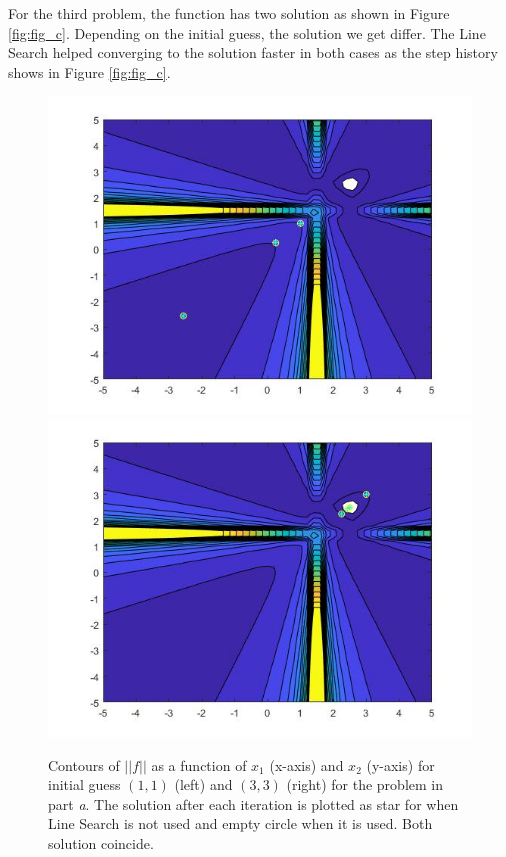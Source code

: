 For the third problem, the function has two solution as shown in Figure \ref{fig:fig_c}. Depending on the initial guess, the solution we get differ. The Line Search helped converging to the solution faster in both cases as the step history shows in Figure \ref{fig:fig_c}. 


\begin{figure}[H]
 \centering  
   {\includegraphics[width=0.49\linewidth]{code/fun1_a1.jpg}}   
   {\includegraphics[width=0.49\linewidth]{code/fun1_a2.jpg}}
  \caption{Contours of $||f||$ as a function of $x_{1}$ (x-axis) and $x_{2}$ (y-axis) for initial guess $(1,1)$ (left) and $(3,3)$ (right) for the problem in part \emph{a}. The solution after each iteration is plotted as star for when Line Search is not used and empty circle when it is used. Both solution coincide.}
   \label{fig:fig_a}
\end{figure} 


